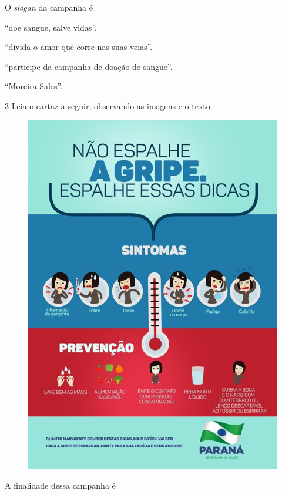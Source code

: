 O \emph{slogan} da campanha é

\begin{escolha}
\item ``doe sangue, salve vidas''.

\item ``divida o amor que corre nas suas veias''.

\item ``participe da campanha de doação de sangue''.

\item ``Moreira Sales''.
\end{escolha}

\pagebreak
\num{3} Leia o cartaz a seguir, observando as imagens e o texto. 


\begin{figure}[htpb!]
\centering
\includegraphics[width=.7\textwidth]{media/image19.png}
\end{figure}

A finalidade dessa campanha é

